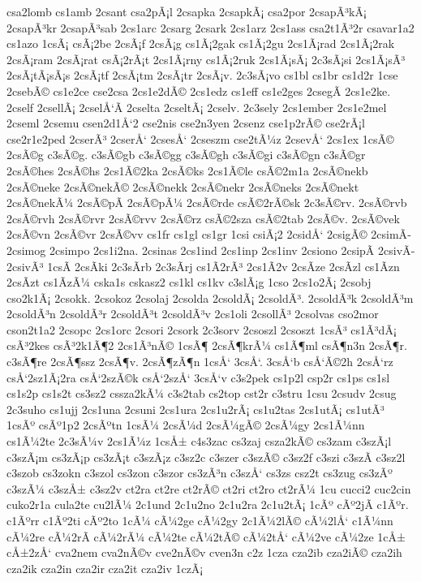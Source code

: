 {csa2lomb
cs1amb
2csant
csa2pÃ¡l
2csapka
2csapkÃ¡
csa2por
2csapÃ³kÃ¡
2csapÃ³kr
2csapÃ³sab
2cs1arc
2csarg
2csark
2cs1arz
2cs1ass
csa2t1Ã³2r
csavar1a2
cs1azo
1csÃ¡
csÃ¡2be
2csÃ¡f
2csÃ¡g
cs1Ã¡2gak
cs1Ã¡2gu
2cs1Ã¡rad
2cs1Ã¡2rak
2csÃ¡ram
2csÃ¡rat
csÃ¡2rÃ¡t
2cs1Ã¡rny
cs1Ã¡2ruk
2cs1Ã¡sÃ¡
2c3sÃ¡si
2cs1Ã¡sÃ³
2csÃ¡tÃ¡sÃ¡s
2csÃ¡tf
2csÃ¡tm
2csÃ¡tr
2csÃ¡v.
2c3sÃ¡vo
cs1bl
cs1br
cs1d2r
1cse
2csebÃ©
cs1e2ce
cse2csa
2cs1e2dÃ©
2cs1edz
cs1eff
cs1e2ges
2csegÃ­
2cs1e2ke.
2cself
2csellÃ¡
2cselÅ‘Ã­
2cselta
2cseltÃ¡
2cselv.
2c3sely
2cs1ember
2cs1e2mel
2cseml
2csemu
csen2d1Å‘2
cse2nis
cse2n3yen
2csenz
cse1p2rÃ©
cse2rÃ¡l
cse2r1e2ped
2cserÃ³
2cserÅ‘
2csesÅ‘
2cseszm
cse2tÃ¼z
2csevÅ‘
2cs1ex
1csÃ©
2csÃ©g
c3sÃ©g.
c3sÃ©gb
c3sÃ©gg
c3sÃ©gh
c3sÃ©gi
c3sÃ©gn
c3sÃ©gr
2csÃ©hes
2csÃ©hs
2cs1Ã©2ka
2csÃ©ks
2cs1Ã©le
csÃ©2m1a
2csÃ©nekb
2csÃ©neke
2csÃ©nekÃ©
2csÃ©nekk
2csÃ©nekr
2csÃ©neks
2csÃ©nekt
2csÃ©nekÃ¼
2csÃ©pÃ­
2csÃ©pÃ¼
2csÃ©rde
csÃ©2rÃ©sk
2c3sÃ©rv.
2csÃ©rvb
2csÃ©rvh
2csÃ©rvr
2csÃ©rvv
2csÃ©rz
csÃ©2sza
csÃ©2tab
2csÃ©v.
2csÃ©vek
2csÃ©vn
2csÃ©vr
2csÃ©vv
cs1fr
cs1gl
cs1gr
1csi
csiÃ¡2
2csidÅ‘
2csigÃ©
2csimÃ­
2csimog
2csimpo
2cs1i2na.
2csinas
2cs1ind
2cs1inp
2cs1inv
2csiono
2csipÃ­
2csivÃ­
2csivÃ³
1csÃ­
2csÃ­ki
2c3sÃ­rb
2c3sÃ­rj
cs1Ã­2rÃ³
2cs1Ã­2v
2csÃ­ze
2csÃ­zl
cs1Ã­zn
2csÃ­zt
cs1Ã­zÃ¼
cska1s
cskasz2
cs1kl
cs1kv
c3slÃ¡g
1cso
2cs1o2Ã¡
2csobj
cso2k1Ã¡
2csokk.
2csokoz
2csolaj
2csolda
2csoldÃ¡
2csoldÃ³.
2csoldÃ³k
2csoldÃ³m
2csoldÃ³n
2csoldÃ³r
2csoldÃ³t
2csoldÃ³v
2cs1oli
2csollÃ³
2csolvas
cso2mor
cson2t1a2
2csopc
2cs1orc
2csori
2csork
2c3sorv
2csoszl
2csoszt
1csÃ³
cs1Ã³dÃ¡
csÃ³2kes
csÃ³2k1Ã¶2
2cs1Ã³nÃ©
1csÃ¶
2csÃ¶krÃ¼
cs1Ã¶ml
csÃ¶n3n
2csÃ¶r.
c3sÃ¶re
2csÃ¶ssz
2csÃ¶v.
2csÃ¶zÃ¶n
1csÅ‘
3csÅ‘.
3csÅ‘b
csÅ‘Ã©2h
2csÅ‘rz
csÅ‘2sz1Ã¡2ra
csÅ‘2szÃ©k
csÅ‘2szÅ‘
3csÅ‘v
c3s2pek
cs1p2l
csp2r
cs1ps
cs1sl
cs1s2p
cs1s2t
cs3sz2
cssza2kÃ¼
c3s2tab
cs2top
cst2r
c3stru
1csu
2csudv
2csug
2c3suho
cs1ujj
2cs1una
2csuni
2cs1ura
2cs1u2rÃ¡
cs1u2tas
2cs1utÃ¡
cs1utÃ³
1csÃº
csÃº1p2
2csÃºtn
1csÃ¼
2csÃ¼d
2csÃ¼gÃ©
2csÃ¼gy
2cs1Ã¼nn
cs1Ã¼2te
2c3sÃ¼v
2cs1Ã¼z
1csÅ±
c4s3zac
cs3zaj
csza2kÃ©
cs3zam
c3szÃ¡l
c3szÃ¡m
cs3zÃ¡p
cs3zÃ¡t
c3szÃ¡z
c3sz2c
c3szer
c3szÃ©
c3sz2f
c3szi
c3szÃ­
c3sz2l
c3szob
cs3zokn
c3szol
cs3zon
c3szor
cs3zÃ³n
c3szÅ‘
cs3zs
csz2t
cs3zug
cs3zÃº
c3szÃ¼
c3szÅ±
c3sz2v
ct2ra
ct2re
ct2rÃ©
ct2ri
ct2ro
ct2rÃ¼
1cu
cucci2
cuc2cin
cuko2r1a
cula2te
cu2lÃ¼
2c1und
2c1u2no
2c1u2ra
2c1u2tÃ¡
1cÃº
cÃº2jÃ­
c1Ãºr.
c1Ãºrr
c1Ãº2ti
cÃº2to
1cÃ¼
cÃ¼2ge
cÃ¼2gy
2c1Ã¼2lÃ©
cÃ¼2lÅ‘
c1Ã¼nn
cÃ¼2re
cÃ¼2rÃ­
cÃ¼2rÃ¼
cÃ¼2te
cÃ¼2tÃ©
cÃ¼2tÅ‘
cÃ¼2ve
cÃ¼2ze
1cÅ±
cÅ±2zÅ‘
cva2nem
cva2nÃ©v
cve2nÃ©v
cven3n
c2z
1cza
cza2ib
cza2iÃ©
cza2ih
cza2ik
cza2in
cza2ir
cza2it
cza2iv
1czÃ¡
}
